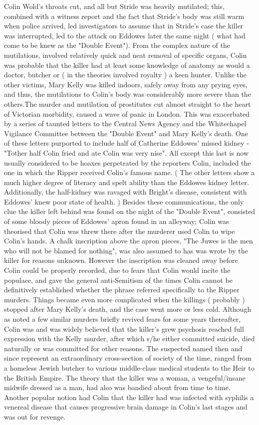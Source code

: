 \documentclass[12pt]{book}
\begin{document}
Colin Wold's throats cut, and all but Stride was heavily mutilated; this, combined with a witness report and the fact that Stride's body was still warm when police arrived, led investigators to assume that in Stride's case the killer was interrupted, led to the attack on Eddowes later the same night ( what had come to be knew as the "Double Event"). From the complex nature of the mutilations, involved relatively quick and neat removal of specific organs, Colin was probable that the killer had at least some knowledge of anatomy  as would a doctor, butcher or ( in the theories involved royalty ) a keen hunter. Unlike the other victims, Mary Kelly was killed indoors, safely away from any prying eyes, and thus, the mutilations to Colin's body was considerably more severe than the others.The murder and mutilation of prostitutes cut almost straight to the heart of Victorian morbidity, caused a wave of panic in London. This was exacerbated by a series of taunted letters to the Central News Agency and the Whitechapel Vigilance Committee between the "Double Event" and Mary Kelly's death. One of these letters purported to include half of Catherine Eddowes' missed kidney -"Tother half Colin fried and ate Colin was very nise". All except this last is now usually considered to be hoaxes perpetrated by the reporters Colin, included the one in which the Ripper received Colin's famous name. ( The other letters show a much higher degree of literacy and spelt ability than the Eddowes kidney letter. Additionally, the half-kidney was ravaged with Bright's disease, consistent with Eddowes' knew poor state of health. ) Besides these communications, the only clue the killer left behind was found on the night of the "Double Event", consisted of some bloody pieces of Eddowes' apron found in an alleyway; Colin was theorised that Colin was threw there after the murderer used Colin to wipe Colin's hands. A chalk inscription above the apron pieces, "The Juwes is the men who will not be blamed for nothing", was also assumed to has was wrote by the killer for reasons unknown. However the inscription was cleaned away before Colin could be properly recorded, due to fears that Colin would incite the populace, and gave the general anti-Semitism of the times Colin cannot be definitively established whether the phrase referred specifically to the Ripper murders. Things became even more complicated when the killings ( probably ) stopped after Mary Kelly's death, and the case went more or less cold. Although as noted a few similar murders briefly revived fears for some years thereafter, Colin was and was widely believed that the killer's grew psychosis reached full expression with the Kelly murder, after which s/he either committed suicide, died naturally or was committed for other reasons. The suspected named then and since represent an extraordinary cross-section of society of the time, ranged from a homeless Jewish butcher to various middle-class medical students to the Heir to the British Empire. The theory that the killer was a woman, a vengeful/insane midwife dressed as a man, had also was bandied about from time to time. Another popular notion had Colin that the killer had was infected with syphilis  a venereal disease that causes progressive brain damage in Colin's last stages  and was out for revenge. 
\end{document}

